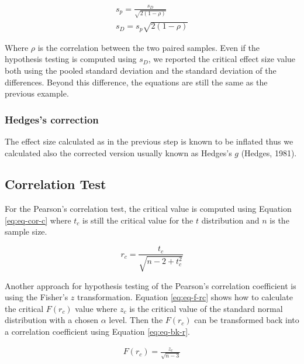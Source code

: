 \documentclass[
  man]{apa7}
\begin{document}
\begin{equation}
    \label{eq:eq-sp-sd}
    \begin{gathered}
        s_p =  \frac{s_D}{\sqrt{2(1 - \rho)}} \\
        s_D =  s_p \sqrt{2(1 - \rho)}
    \end{gathered}
\end{equation}

Where \(\rho\) is the correlation between the two paired samples. Even if the hypothesis testing is computed using \(s_D\), we reported the critical effect size value both using the pooled standard deviation and the standard deviation of the differences. Beyond this difference, the equations are still the same as the previous example.

\hypertarget{hedgess-correction}{%
\subsubsection{Hedges's correction}\label{hedgess-correction}}

The effect size calculated as in the previous step is known to be inflated thus we calculated also the corrected version usually known as Hedges's \(g\) (Hedges, 1981).

\hypertarget{correlation-test}{%
\subsection{Correlation Test}\label{correlation-test}}

For the Pearson's correlation test, the critical value is computed using Equation \eqref{eq:eq-cor-c} where \(t_c\) is still the critical value for the \(t\) distribution and \(n\) is the sample size.

\begin{equation}
    \label{eq:eq-cor-c}
    r_c = \frac{t_c}{\sqrt{n - 2 + t_c^2}}
\end{equation}

Another approach for hypothesis testing of the Pearson's correlation coefficient is using the Fisher's \(z\) transformation. Equation \eqref{eq:eq-f-rc} shows how to calculate the critical \(F(r_c)\) value where \(z_c\) is the critical value of the standard normal distribution with a chosen \(\alpha\) level. Then the \(F(r_c)\) can be transformed back into a correlation coefficient using Equation \eqref{eq:eq-bk-r}.

\begin{equation}
    \label{eq:eq-f-rc}
    \begin{gathered}
        F(r_c) = \frac{z_c}{\sqrt{n - 3}}
    \end{gathered}
\end{equation}
\end{document}
